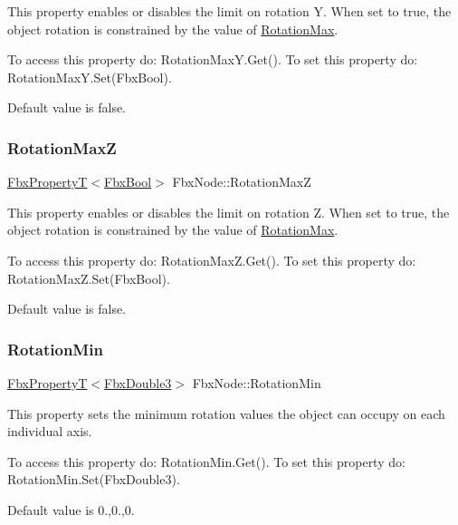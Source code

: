 This property enables or disables the limit on rotation Y. When set to {\ttfamily true}, the object rotation is constrained by the value of \hyperlink{class_fbx_node_a04c8e5651641fbfafaa2adb18be50696}{Rotation\+Max}.

To access this property do\+: Rotation\+Max\+Y.\+Get(). To set this property do\+: Rotation\+Max\+Y.\+Set(\+Fbx\+Bool).

Default value is false. \mbox{\label{class_fbx_node_a6d1242899fb510f5d5df4f3a1a7cf32c}} 
\subsubsection{\texorpdfstring{Rotation\+MaxZ}{RotationMaxZ}}
{\footnotesize\ttfamily \hyperlink{class_fbx_property_t}{Fbx\+PropertyT}$<$\hyperlink{fbxtypes_8h_a92e0562b2fe33e76a242f498b362262e}{Fbx\+Bool}$>$ Fbx\+Node\+::\+Rotation\+MaxZ}

This property enables or disables the limit on rotation Z. When set to {\ttfamily true}, the object rotation is constrained by the value of \hyperlink{class_fbx_node_a04c8e5651641fbfafaa2adb18be50696}{Rotation\+Max}.

To access this property do\+: Rotation\+Max\+Z.\+Get(). To set this property do\+: Rotation\+Max\+Z.\+Set(\+Fbx\+Bool).

Default value is false. \mbox{\label{class_fbx_node_a186dc96c347a68ff32eb1641f02c70c8}} 
\subsubsection{\texorpdfstring{Rotation\+Min}{RotationMin}}
{\footnotesize\ttfamily \hyperlink{class_fbx_property_t}{Fbx\+PropertyT}$<$\hyperlink{fbxtypes_8h_ae0a96f14cde566774c7553aa7523b7a7}{Fbx\+Double3}$>$ Fbx\+Node\+::\+Rotation\+Min}

This property sets the minimum rotation values the object can occupy on each individual axis.

To access this property do\+: Rotation\+Min.\+Get(). To set this property do\+: Rotation\+Min.\+Set(\+Fbx\+Double3).

Default value is 0.,0.,0. \mbox{\label{class_fbx_node_a8b07f4e0bae14c76b79405c0f881a492}} 
